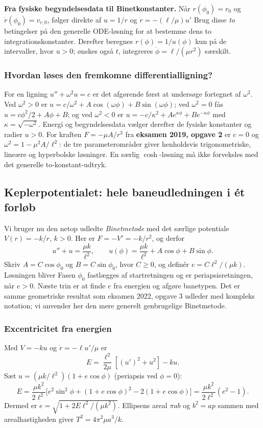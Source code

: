 \textbf{Fra fysiske begyndelsesdata til Binetkonstanter.}
Når $r(\phi_0)=r_0$ og $\dot r(\phi_0)=v_{r,0}$, følger direkte af $u=1/r$ og $\dot r=-(\ell/\mu)u'$
Brug disse \emph{to} betingelser på den generelle ODE-løsning for at bestemme dens to integrationskonstanter. Derefter beregnes $r(\phi)=1/u(\phi)$ kun på de intervaller, hvor $u>0$; ønskes også $t$, integreres $\dot\phi=\ell/(\mu r^2)$ særskilt.

\subsubsection*{Hvordan løses den fremkomne differentialligning?}
For en ligning $u''+\omega^2u=c$ er det afgørende først at undersøge fortegnet af $\omega^2$. Ved $\omega^2>0$ er
$u=c/\omega^2+A\cos(\omega\phi)+B\sin(\omega\phi)$; ved $\omega^2=0$ fås $u=c\phi^2/2+A\phi+B$; og ved $\omega^2<0$ er
$u=-c/\kappa^2+A e^{\kappa\phi}+B e^{-\kappa\phi}$ med $\kappa=\sqrt{-\omega^2}$. Energi og begyndelsesdata vælger derefter de fysiske konstanter og radier $u>0$.
For kraften $F=-\mu A/r^3$ fra \textbf{eksamen 2019, opgave 2} er $c=0$ og $\omega^2=1-\mu^2 A/\ell^2$: de tre parameterområder giver henholdsvis trigonometriske, lineære og hyperbolske løsninger. En særlig $\cosh$-løsning må ikke forveksles med det generelle to-konstant-udtryk.



\subsection{Keplerpotentialet: hele baneudledningen i ét forløb}
\label{sec:kepler}
Vi bruger nu den netop udledte \emph{Binetmetode} med det særlige potentiale $V(r)=-k/r$, $k>0$. Her er $F=-V'=-k/r^2$, og derfor
\[
u''+u=\frac{\mu k}{\ell^2},\qquad
u(\phi)=\frac{\mu k}{\ell^2}+A\cos\phi+B\sin\phi.
\]
Skriv $A=C\cos\phi_0$ og $B=C\sin\phi_0$, hvor $C\ge0$, og definér $e=C\ell^2/(\mu k)$. Løsningen bliver
Fasen $\phi_0$ fastlægges af startretningen og er periapsisretningen, når $e>0$. Næste trin er at finde $e$ fra energien og afgøre banetypen. Det er samme geometriske resultat som eksamen 2022, opgave 3 udleder med kompleks notation; vi anvender her den mere generelt genbrugelige Binetmetode.

\subsubsection*{Excentricitet fra energien}
Med $V=-ku$ og $\dot r=-\ell u'/\mu$ er
\[E=\frac{\ell^2}{2\mu}[(u')^2+u^2]-ku.\]
Sæt $u=(\mu k/\ell^2)(1+e\cos\phi)$ (periapsis ved $\phi=0$):
\[E=\frac{\mu k^2}{2\ell^2}\big[e^2\sin^2\phi+(1+e\cos\phi)^2-2(1+e\cos\phi)\big]=\frac{\mu k^2}{2\ell^2}(e^2-1).\]
Dermed er $\boxed{e=\sqrt{1+2E\ell^2/(\mu k^2)}}$. Ellipsens areal $\pi ab$ og $b^2=ap$ sammen med arealhastigheden giver $T^2=4\pi^2\mu a^3/k$.


